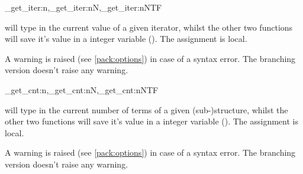 \documentclass[10pt]{article}
\begin{document}
\begin{codedescribe}{\starray_get_iter:n,\starray_get_iter:nN,\starray_get_iter:nNTF}
\begin{codesyntax}%
\end{codesyntax}
 will type in the current value of a given iterator, whilst the other two functions will save it's value in a integer variable (\cite{expl3}).  The assignment is local.

\end{codedescribe}
\begin{tsremark}
A warning is raised (see \ref{pack:options}) in case of a  syntax error. The branching version doesn't raise any warning.
\end{tsremark}




\begin{codedescribe}{\starray_get_cnt:n,\starray_get_cnt:nN,\starray_get_cnt:nNTF}
\begin{codesyntax}%
\end{codesyntax}
 will type in the current number of terms of a given (sub-)structure, whilst the other two functions will save it's value in a integer variable (\cite{expl3}).  The assignment is local.

\end{codedescribe}
\begin{tsremark}
A warning is raised (see \ref{pack:options}) in case of a  syntax error. The branching version doesn't raise any warning.
\end{tsremark}
\end{document}
